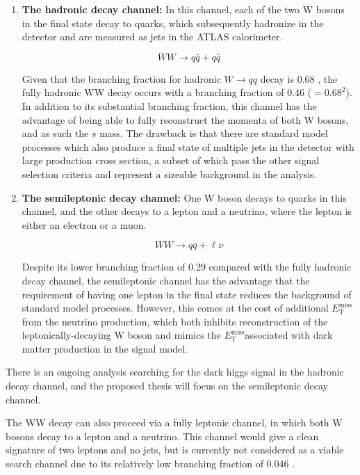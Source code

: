 \documentclass[12pt]{article}
\newcommand*{\met}{\ensuremath{E_\text{T}^\text{miss}}}
\begin{document}
\begin{enumerate}

\item \textbf{The hadronic decay channel:} In this channel, each of the two W bosons in the final state decay to quarks, which subsequently hadronize in the detector and are measured as jets in the ATLAS calorimeter.

\begin{equation}
\nonumber
WW \rightarrow q\bar{q}+q\bar{q}
\end{equation}

Given that the branching fraction for hadronic $W \rightarrow qq$ decay is 0.68 \cite{PDG}, the fully hadronic WW decay occurs with a branching fraction of 0.46 ($=0.68^2$). In addition to its substantial branching fraction, this channel has the advantage of being able to fully reconstruct the momenta of both W bosons, and as such the $s$ mass. The drawback is that there are standard model processes which also produce a final state of multiple jets in the detector with large production cross section, a subset of which pass the other signal selection criteria and represent a sizeable background in the analysis. 

\item \textbf{The semileptonic decay channel:} One W boson decays to quarks in this channel, and the other decays to a lepton and a neutrino, where the lepton is either an electron or a muon. 

\begin{equation}
\nonumber
WW \rightarrow q\bar{q}+\ell\nu
\end{equation}

Despite its lower branching fraction of 0.29 \cite{PDG} compared with the fully hadronic decay channel, the semileptonic channel has the advantage that the requirement of having one lepton in the final state reduces the background of standard model processes. However, this comes at the cost of additional \met from the neutrino production, which both inhibits reconstruction of the leptonically-decaying W boson and mimics the \met associated with dark matter production in the signal model. 

\end{enumerate}

There is an ongoing analysis searching for the dark higgs signal in the hadronic decay channel, and the proposed thesis will focus on the semileptonic decay channel. 

The WW decay can also proceed via a fully leptonic channel, in which both W bosons decay to a lepton and a neutrino. This channel would give a clean signature of two leptons and no jets, but is currently not considered as a viable search channel due to its relatively low branching fraction of 0.046 \cite{PDG}.
\end{document}
